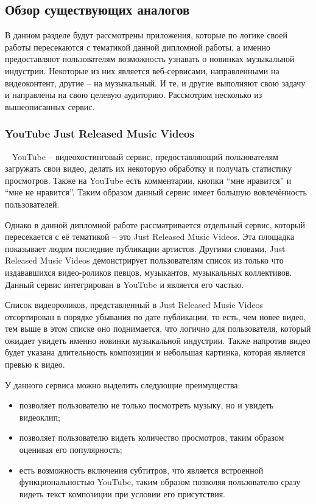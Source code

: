 \subsection{Обзор существующих аналогов}
\label{sub:domain:analogues_review}
В данном разделе будут рассмотрены приложения, которые по логике своей работы пересекаются с тематикой данной дипломной работы, а именно предоставляют пользователям возможность узнавать о новинках музыкальной индустрии. Некоторые из них является веб-сервисами, направленными на видеоконтент, другие -- на музыкальный. И те, и другие выполняют свою задачу и направлены на свою целевую аудиторию. Рассмотрим несколько из вышеописанных сервис.

\subsubsection{YouTube Just Released Music Videos}
\label{sub:domain:analogues_review:youtube}
~\newline
\indent YouTube -- видеохостинговый сервис, предоставляющий пользователям загружать свои видео, делать их некоторую обработку и получать статистику просмотров. Также на YouTube есть комментарии, кнопки “мне нравится” и “мне не нравится”. Таким образом данный сервис имеет большую вовлечённость пользователей.

Однако в данной дипломной работе рассматривается отдельный сервис, который пересекается с её тематикой -- это Just Released Music Videos. Эта площадка показывает людям последние публикации артистов. Другими словами, Just Released Music Videos демонстрирует пользователям список из только что издававшихся видео-роликов певцов, музыкантов, музыкальных коллективов. Данный сервис интегрирован в YouTube и является его частью.

Список видеороликов, представленный в Just Released Music Videos отсортирован в порядке убывания по дате публикации, то есть, чем новее видео, тем выше в этом списке оно поднимается, что логично для пользователя, который ожидает увидеть именно новинки музыкальной индустрии. Также напротив видео будет указана длительность композиции и небольшая картинка, которая является превью к видео.

У данного сервиса можно выделить следующие преимущества:

\begin{itemize}
  \item позволяет пользователю не только посмотреть музыку, но и увидеть видеоклип;
  \item позволяет пользователю видеть количество просмотров, таким образом оценивая его популярность;
  \item есть возможность включения субтитров, что является встроенной функциональностью YouTube, таким образом позволяя пользователю сразу видеть текст композиции при условии его присутствия.
\end{itemize}

